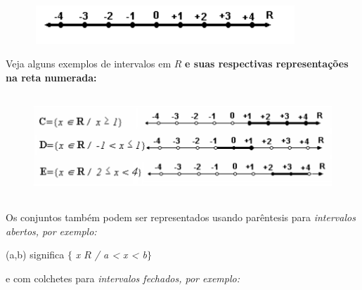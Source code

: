 \documentclass[12pt]{article}
\renewcommand{\_}{\kern-1.5pt\textunderscore\kern-1.5pt}
\begin{document}
\begin{enumerate}[label*={\fontsize{12pt}{12pt}\selectfont \textbf{\arabic*.}}]

\begin{figure}[H]
	\begin{Center}
		\includegraphics[width=3.9in,height=0.57in]{./media/image9.pdf}
	\end{Center}
\end{figure}



\par

Veja alguns exemplos de intervalos em  \( R \) \textbf{ e suas respectivas representações na reta numerada:}\par




\begin{figure}[H]
	\begin{Center}
		\includegraphics[width=5.72in,height=1.53in]{./media/image10.pdf}
	\end{Center}
\end{figure}



\par

Os conjuntos também podem ser representados usando parêntesis para \textit{intervalos abertos, por exemplo:}\par

(a,b) significa $ \{ $ \textit{ x   \( R \)  / a < x < b$ \} $ }\par

e com colchetes para \textit{intervalos fechados, por exemplo:}\par


\end{enumerate}
\end{document}
